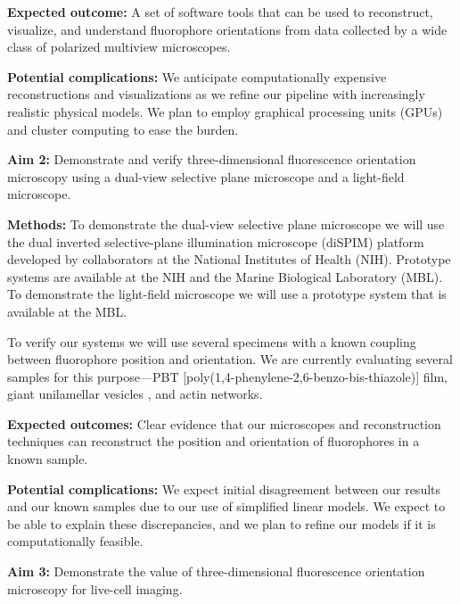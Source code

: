 \documentclass[12pt]{article}
\begin{document}
\noindent\textbf{Expected outcome:} A set of software tools that can be used
to reconstruct, visualize, and understand fluorophore orientations from data
collected by a wide class of polarized multiview microscopes.

\noindent\textbf{Potential complications:} We anticipate computationally
expensive reconstructions and visualizations as we refine our pipeline with
increasingly realistic physical models. We plan to employ graphical processing
units (GPUs) and cluster computing to ease the burden.

\noindent\textbf{Aim 2:} Demonstrate and verify three-dimensional fluorescence
orientation microscopy using a dual-view selective plane microscope and a
light-field microscope.

\noindent\textbf{Methods:} To demonstrate the dual-view selective plane
microscope we will use the dual inverted selective-plane illumination
microscope (diSPIM) platform developed by collaborators at the National
Institutes of Health (NIH). Prototype systems are available at the NIH and the
Marine Biological Laboratory (MBL). To demonstrate the light-field microscope we
will use a prototype system that is available at the MBL.

To verify our systems we will use several specimens with a known coupling
between fluorophore position and orientation. We are currently evaluating
several samples for this purpose---PBT
[poly(1,4-phenylene-2,6-benzo-bis-thiazole)] film, giant unilamellar vesicles
\cite{schmid}, and actin networks.

\noindent\textbf{Expected outcomes:} Clear evidence that our microscopes and
reconstruction techniques can reconstruct the position and orientation of
fluorophores in a known sample. 

\noindent\textbf{Potential complications:} We expect initial disagreement
between our results and our known samples due to our use of simplified linear
models. We expect to be able to explain these discrepancies, and we plan to
refine our models if it is computationally feasible.

\noindent\textbf{Aim 3:} Demonstrate the value of three-dimensional fluorescence
  orientation microscopy for live-cell imaging.
\end{document}
